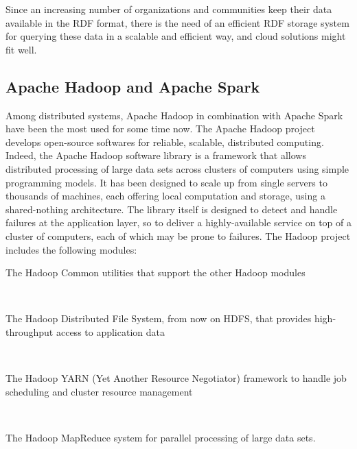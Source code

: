 \documentclass[10pt, a4paper]{report}
\begin{document}
Since an increasing number of organizations and communities keep their data available in the RDF format, there is the need of an efficient RDF storage system for querying these data in a scalable and efficient way, and cloud solutions might fit well.

\subsection{Apache Hadoop and Apache Spark}

Among distributed systems, Apache Hadoop in combination with Apache Spark have been the most used for some time now. The Apache Hadoop project develops open-source softwares for reliable, scalable, distributed computing. Indeed, the Apache Hadoop software library is a framework that allows distributed processing of large data sets across clusters of computers using simple programming models. It has been designed to scale up from single servers to thousands of machines, each offering local computation and storage, using a shared-nothing architecture. The library itself is designed to detect and handle failures at the application layer, so to deliver a highly-available service on top of a cluster of computers, each of which may be prone to failures\cite{apache_hadoop}. The Hadoop project includes the following modules: \\

\begin{itemize}
	\begin{minipage}{0.92\textwidth}
		\item The Hadoop Common utilities that support the other Hadoop modules \\
	\end{minipage} \\
	\begin{minipage}{0.92\textwidth}
		\item The Hadoop Distributed File System\cite{hdfs}, from now on HDFS, that provides high-throughput access to application data \\
	\end{minipage} \\
	\begin{minipage}{0.92\textwidth}
		\item The Hadoop YARN (Yet Another Resource Negotiator) framework to handle job scheduling and cluster resource management \\
	\end{minipage} \\
	\begin{minipage}{0.92\textwidth}
		\item The Hadoop MapReduce\cite{mapreduce} system for parallel processing of large data sets. \\
	\end{minipage}
\end{itemize}
\end{document}
